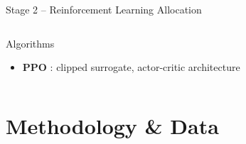 \documentclass[aspectratio=169,11pt]{beamer}
\begin{document}
\begin{frame}{Stage 2 -- Reinforcement Learning Allocation}
\begin{columns}[T]
			\begin{exampleblock}{Algorithms}
				{\small
					\begin{itemize}\setlength\itemsep{2pt}
						\item \textbf{PPO} \citep{schulman2019}: clipped surrogate,
						actor-critic architecture
				\end{itemize}}
			\end{exampleblock}
		\end{columns}
	\end{frame}
	
	\section{Methodology \& Data}
	
\end{document}
